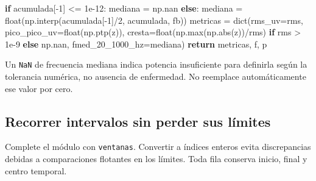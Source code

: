 \documentclass[
  spanish,
  10.5pt,
  a4paper,
  DIV=11,
  numbers=noendperiod]{scrartcl}
\newenvironment{Shaded}{\begin{snugshade}}{\end{snugshade}}
\newcommand{\BuiltInTok}[1]{\textcolor[rgb]{0.00,0.23,0.31}{#1}}
\newcommand{\ControlFlowTok}[1]{\textcolor[rgb]{0.00,0.23,0.31}{\textbf{#1}}}
\newcommand{\DecValTok}[1]{\textcolor[rgb]{0.68,0.00,0.00}{#1}}
\newcommand{\FloatTok}[1]{\textcolor[rgb]{0.68,0.00,0.00}{#1}}
\newcommand{\NormalTok}[1]{\textcolor[rgb]{0.00,0.23,0.31}{#1}}
\newcommand{\OperatorTok}[1]{\textcolor[rgb]{0.37,0.37,0.37}{#1}}
\begin{document}
\begin{Shaded}
\begin{Highlighting}[]
    \ControlFlowTok{if}\NormalTok{ acumulada[}\OperatorTok{{-}}\DecValTok{1}\NormalTok{] }\OperatorTok{\textless{}=} \FloatTok{1e{-}12}\NormalTok{:}
\NormalTok{        mediana }\OperatorTok{=}\NormalTok{ np.nan}
    \ControlFlowTok{else}\NormalTok{:}
\NormalTok{        mediana }\OperatorTok{=} \BuiltInTok{float}\NormalTok{(np.interp(acumulada[}\OperatorTok{{-}}\DecValTok{1}\NormalTok{]}\OperatorTok{/}\DecValTok{2}\NormalTok{, acumulada, fb))}
\NormalTok{    metricas }\OperatorTok{=} \BuiltInTok{dict}\NormalTok{(rms\_uv}\OperatorTok{=}\NormalTok{rms, pico\_pico\_uv}\OperatorTok{=}\BuiltInTok{float}\NormalTok{(np.ptp(z)),}
\NormalTok{                   cresta}\OperatorTok{=}\BuiltInTok{float}\NormalTok{(np.}\BuiltInTok{max}\NormalTok{(np.}\BuiltInTok{abs}\NormalTok{(z))}\OperatorTok{/}\NormalTok{rms)}
                   \ControlFlowTok{if}\NormalTok{ rms }\OperatorTok{\textgreater{}} \FloatTok{1e{-}9} \ControlFlowTok{else}\NormalTok{ np.nan,}
\NormalTok{                   fmed\_20\_1000\_hz}\OperatorTok{=}\NormalTok{mediana)}
    \ControlFlowTok{return}\NormalTok{ metricas, f, p}
\end{Highlighting}
\end{Shaded}

Un \texttt{NaN} de frecuencia mediana indica potencia insuficiente para
definirla según la tolerancia numérica, no ausencia de enfermedad. No
reemplace automáticamente ese valor por cero.

\subsection{Recorrer intervalos sin perder sus
límites}\label{recorrer-intervalos-sin-perder-sus-luxedmites}

Complete el módulo con \texttt{ventanas}. Convertir a índices enteros
evita discrepancias debidas a comparaciones flotantes en los límites.
Toda fila conserva inicio, final y centro temporal.
\end{document}
